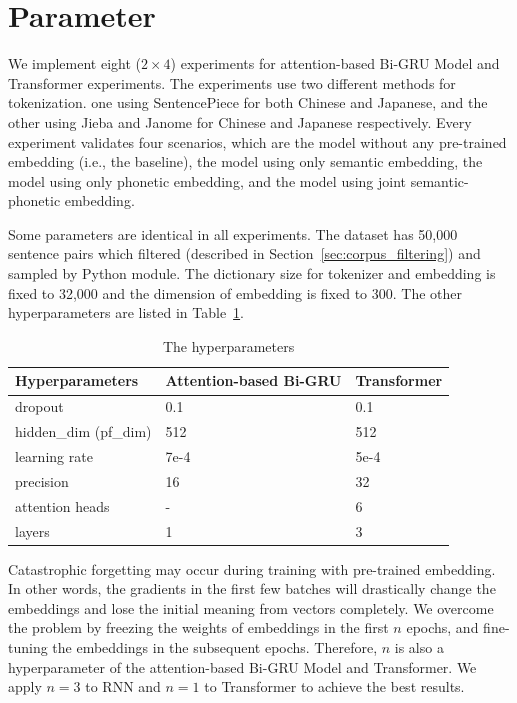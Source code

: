 \section{Parameter} \label{sec:parameter}

We implement eight ($2\!\times\!4$) experiments for attention-based Bi-GRU Model and Transformer experiments.
The experiments use two different methods for tokenization. one using SentencePiece for both Chinese and Japanese, and the other using Jieba and Janome for Chinese and Japanese respectively. Every experiment validates four scenarios, which are the model without any pre-trained embedding (i.e., the baseline), the model using only semantic embedding, the model using only phonetic embedding, and the model using joint semantic-phonetic embedding.

Some parameters are identical in all experiments. The dataset has 50,000 sentence pairs which filtered (described in Section~\ref{sec:corpus_filtering}) and sampled by Python  module. The dictionary size for tokenizer and embedding is fixed to 32,000 and the dimension of embedding is fixed to 300. The other hyperparameters are listed in Table~\ref{tab:hyperparameters}.

\vspace{0.4cm}
\begin{table}[h]
    \centering
    \begin{tabularx}{\textwidth}{bbb}\toprule
        Hyperparameters & Attention-based Bi-GRU & Transformer \\\midrule
        dropout & 0.1 & 0.1 \\
        hidden\_dim (pf\_dim) & 512 & 512 \\
        learning rate & 7e-4 & 5e-4 \\
        precision & 16 & 32 \\
        attention heads & - & 6 \\
        layers & 1 & 3 \\ 
        \bottomrule
    \end{tabularx}
    \caption{The hyperparameters}
    \label{tab:hyperparameters}
\end{table}

Catastrophic forgetting \cite{kirkpatrick2017overcoming} may occur during training with pre-trained embedding. In other words, the gradients in the first few batches will drastically change the embeddings and lose the initial meaning from vectors completely. We overcome the problem by freezing the weights of embeddings in the first $n$ epochs, and fine-tuning the embeddings in the subsequent epochs. Therefore, $n$ is also a hyperparameter of the attention-based Bi-GRU Model and Transformer. We apply $n=3$ to RNN and $n=1$ to Transformer to achieve the best results.

